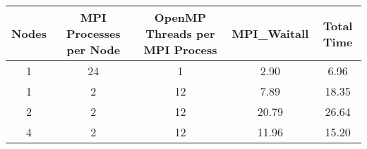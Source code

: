 \begin{tabular}{ccccc}
    \toprule
    \textbf{Nodes} & \textbf{MPI Processes per Node} & \textbf{OpenMP Threads per MPI Process} & \textbf{MPI\_Waitall} & \textbf{Total Time} \\
    \midrule
    1 & 24 & 1 & 2.90 & 6.96 \\
    1 & 2 & 12 & 7.89 & 18.35 \\
    2 & 2 & 12 & 20.79 & 26.64 \\
    4 & 2 & 12 & 11.96 & 15.20 \\
    \bottomrule
\end{tabular}
